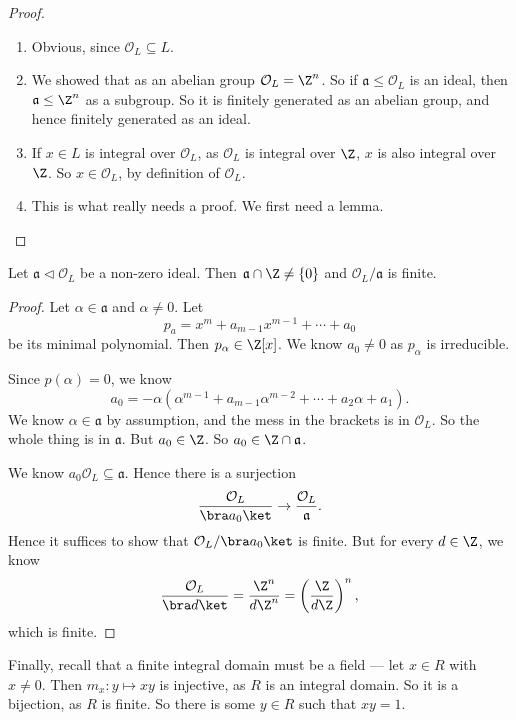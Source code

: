 \documentclass[a4paper]{article}
\begin{document}
\begin{proof}\leavevmode
  \begin{enumerate}
    \item Obvious, since $\mathcal{O}_L \subseteq L$.
    \item We showed that as an abelian group $\mathcal{O}_L = \Z^n$. So if $\mathfrak{a} \leq \mathcal{O}_L$ is an ideal, then $\mathfrak{a} \leq \Z^n$ as a subgroup. So it is finitely generated as an abelian group, and hence finitely generated as an ideal.
    \item If $x \in L$ is integral over $\mathcal{O}_L$, as $\mathcal{O}_L$ is integral over $\Z$, $x$ is also integral over $\Z$. So $x \in \mathcal{O}_L$, by definition of $\mathcal{O}_L$.
    \item This is what really needs a proof. We first need a lemma.
  \end{enumerate}
\end{proof}

\begin{lemma}
  Let $\mathfrak{a}\lhd \mathcal{O}_L$ be a non-zero ideal. Then $\mathfrak{a} \cap \Z \not= \{0\}$ and $\mathcal{O}_L/\mathfrak{a}$ is finite.
\end{lemma}

\begin{proof}
  Let $\alpha \in \mathfrak{a}$ and $\alpha \not= 0$. Let
  \[
    p_a = x^m + a_{m - 1}x^{m - 1} + \cdots + a_0
  \]
  be its minimal polynomial. Then $p_\alpha \in \Z[x]$. We know $a_0 \not= 0$ as $p_\alpha$ is irreducible.

  Since $p(\alpha) = 0$, we know
  \[
    a_0 = -\alpha(\alpha^{m - 1} + a_{m - 1} \alpha^{m - 2} + \cdots + a_2 \alpha + a_1).
  \]
  We know $\alpha \in \mathfrak{a}$ by assumption, and the mess in the brackets is in $\mathcal{O}_L$. So the whole thing is in $\mathfrak{a}$. But $a_0 \in \Z$. So $a_0 \in \Z \cap \mathfrak{a}$.

  We know $a_0 \mathcal{O}_L \subseteq \mathfrak{a}$. Hence there is a surjection
  \[
    \frac{\mathcal{O}_L}{\bra a_0\ket} \rightarrow \frac{\mathcal{O}_L}{\mathfrak{a}}.
  \]
  Hence it suffices to show that $\mathcal{O}_L/\bra a_0\ket$ is finite. But for every $d \in \Z$, we know
  \[
    \frac{\mathcal{O}_L}{\bra d\ket} = \frac{\Z^n}{d\Z^n} = \left(\frac{\Z}{d\Z}\right)^n,
  \]
  which is finite.
\end{proof}

Finally, recall that a finite integral domain must be a field --- let $x \in R$ with $x \not= 0$. Then $m_x: y \mapsto xy$ is injective, as $R$ is an integral domain. So it is a bijection, as $R$ is finite. So there is some $y \in R$ such that $xy = 1$.
\end{document}
